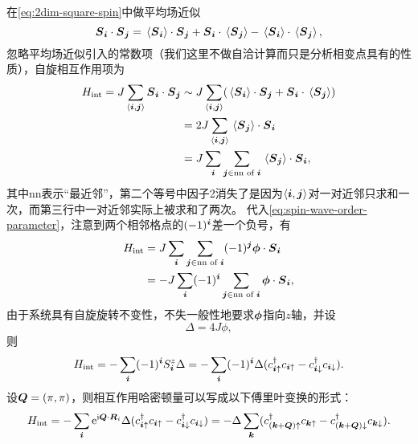 在\eqref{eq:2dim-square-spin}中做平均场近似
\begin{equation}
    \vb*{{S}}_{\vb*{i}} \cdot \vb*{{S}}_{\vb*{j}} = \expval*{\vb*{{S}}_{\vb*{i}}} \cdot \vb*{{S}}_{\vb*{j}} + \vb*{{S}}_{\vb*{i}} \cdot \expval*{\vb*{{S}}_{\vb*{j}}} - \expval*{\vb*{{S}}_{\vb*{i}}} \cdot \expval*{\vb*{{S}}_{\vb*{j}}},
\end{equation}
忽略平均场近似引入的常数项（我们这里不做自洽计算而只是分析相变点具有的性质），自旋相互作用项为
\[
    \begin{aligned}
        {H}_\text{int} = J \sum_{\langle \vb*{i}, \vb*{j} \rangle} {\vb*{S}}_{\vb*{i}} \cdot {\vb*{S}}_{\vb*{j}} &\sim J \sum_{\langle \vb*{i}, \vb*{j} \rangle} (\expval*{\vb*{{S}}_{\vb*{i}}} \cdot \vb*{{S}}_{\vb*{j}} + \vb*{{S}}_{\vb*{i}} \cdot \expval*{\vb*{{S}}_{\vb*{j}}}) \\
        &= 2 J \sum_{\langle \vb*{i}, \vb*{j} \rangle} \expval*{\vb*{{S}}_{\vb*{j}}} \cdot \vb*{{S}}_{\vb*{i}} \\
        &= J \sum_{\vb*{i}} \sum_{\vb*{j} \in \text{nn of } \vb*{i}} \expval*{\vb*{{S}}_{\vb*{j}}} \cdot \vb*{{S}}_{\vb*{i}},
    \end{aligned}
\]
其中nn表示“最近邻”，第二个等号中因子2消失了是因为$\langle \vb*{i}, \vb*{j} \rangle$对一对近邻只求和一次，而第三行中一对近邻实际上被求和了两次。
代入\eqref{eq:spin-wave-order-parameter}，注意到两个相邻格点的$(-1)^{\vb*{i}}$差一个负号，有
\[
    \begin{aligned}
        {H}_\text{int} &= J \sum_{\vb*{i}} \sum_{\vb*{j} \in \text{nn of } \vb*{i}} (-1)^{\vb*{j}} \vb*{\phi} \cdot \vb*{{S}}_{\vb*{i}} \\
        &= - J \sum_{\vb*{i}} (-1)^{\vb*{i}} \sum_{\vb*{j} \in \text{nn of } \vb*{i}} \vb*{\phi} \cdot \vb*{{S}}_{\vb*{i}},
    \end{aligned}
\]
由于系统具有自旋旋转不变性，不失一般性地要求$\vb*{\phi}$指向$z$轴，并设
\begin{equation}
    \Delta = 4 J \phi,
\end{equation}
则
\begin{equation}
    {H}_\text{int} = - \sum_{\vb*{i}} (-1)^{\vb*{i}} {S}_{\vb*{i}}^z \Delta = - \sum_{\vb*{i}} (-1)^{\vb*{i}} \Delta ({c}_{\vb*{i} \uparrow}^\dagger {c}_{\vb*{i} \uparrow} - {c}_{\vb*{i} \downarrow}^\dagger {c}_{\vb*{i} \downarrow}).
\end{equation}
设$\vb*{Q}=(\pi, \pi)$，则相互作用哈密顿量可以写成以下傅里叶变换的形式： 
\begin{equation}
    {H}_\text{int} = - \sum_{\vb*{i}} \mathrm{e}^{\mathrm{i} \vb*{Q} \cdot \vb*{R}_i} \Delta ({c}_{\vb*{i} \uparrow}^\dagger {c}_{\vb*{i} \uparrow} - {c}_{\vb*{i} \downarrow}^\dagger {c}_{\vb*{i} \downarrow}) 
    = - \Delta \sum_{\vb*{k}} ({c}_{(\vb*{k} + \vb*{Q})\uparrow}^\dagger {c}_{\vb*{k} \uparrow} - {c}_{(\vb*{k}+\vb*{Q}) \downarrow}^\dagger {c}_{\vb*{k} \downarrow}).
\end{equation}
